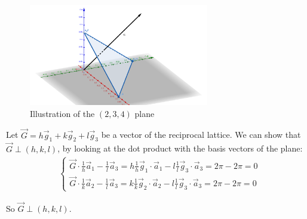 \documentclass[12pt]{article}
\begin{document}
\begin{figure}[!ht]
    \centering
    \includegraphics[width=0.7\textwidth]{2_XRD/Graphics/Exercises/MillerPlane.png}
    \caption{Illustration of the $(2,3,4)$ plane}
    \label{fig:MillerPlane}
\end{figure}
\FloatBarrier

Let $\Vec{G} = h\Vec{g}_1 + k\Vec{g}_2 + l\Vec{g}_3$ be a vector of the reciprocal lattice. We can show that $\Vec{G} \perp (h,k,l)$, by looking at the dot product with the basis vectors of the plane:
\begin{align} 
&\begin{cases}
    \Vec{G} \cdot \frac{1}{h} \Vec{a}_1 - \frac{1}{l} \Vec{a}_3 = h \frac{1}{h} \Vec{g}_1 \cdot \Vec{a}_1 - l\frac{1}{l} \Vec{g}_3 \cdot \Vec{a}_3 = 2\pi - 2\pi = 0\\
    \Vec{G} \cdot \frac{1}{k} \Vec{a}_2 - \frac{1}{l} \Vec{a}_3 = k \frac{1}{k} \Vec{g}_2 \cdot \Vec{a}_2 - l\frac{1}{l} \Vec{g}_3 \cdot \Vec{a}_3 = 2\pi - 2\pi = 0
\end{cases}
\end{align}


So $\Vec{G} \perp (h,k,l)$. \\
\end{document}
